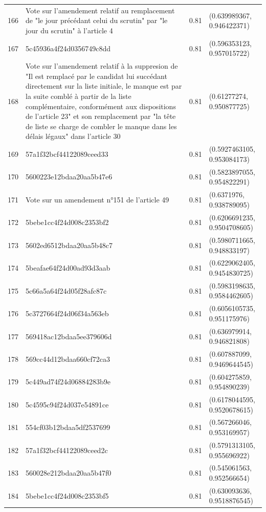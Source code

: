 \begin{table}[ht]
\begin{tabular}{rlrl}
  166 & Vote sur l'amendement relatif au remplacement de "le jour précédant celui du scrutin" par "le jour du scrutin" à l'article 4 & 0.81 & (0.639989367, 0.946422371) \\ 
  167 & 5c45936a4f24d0356749c8dd & 0.81 & (0.596353123, 0.957015722) \\ 
  168 & Vote sur l'amendement relatif à la suppresion de "Il est remplacé par le candidat lui succédant directement sur la liste initiale, le manque est par la suite comblé à partir de la liste complémentaire, conformément aux dispositions de l’article 23" et son remplacement par "la tête de liste se charge de combler le manque dans les délais légaux" dans l'article 30 & 0.81 & (0.61277274, 0.950877725) \\ 
  169 & 57a1f32bcf44122089ceed33 & 0.81 & (0.5927463105, 0.953084173) \\ 
  170 & 5600223e12bdaa20aa5b47e6 & 0.81 & (0.5823897055, 0.954822291) \\ 
  171 & Vote sur un amendement n°151 de l'article 49 & 0.81 & (0.6371976, 0.938789095) \\ 
  172 & 5bebe1cc4f24d008c2353bf2 & 0.81 & (0.6206691235, 0.9504708605) \\ 
  173 & 5602ed6512bdaa20aa5b48c7 & 0.81 & (0.5980711665, 0.948833197) \\ 
  174 & 5beafae64f24d00ad93d3aab & 0.81 & (0.6229062405, 0.9454830725) \\ 
  175 & 5c66a5a64f24d05f28afc87c & 0.81 & (0.5983198635, 0.9584462605) \\ 
  176 & 5c3727664f24d06f34a563eb & 0.81 & (0.6056105735, 0.951175976) \\ 
  177 & 569418ac12bdaa5ee379606d & 0.81 & (0.636979914, 0.946821808) \\ 
  178 & 569cc44d12bdaa660cf72ca3 & 0.81 & (0.607887099, 0.9469644545) \\ 
  179 & 5c449ad74f24d06884283b9e & 0.81 & (0.604275859, 0.954890239) \\ 
  180 & 5c4595c94f24d037e54891ce & 0.81 & (0.6178044595, 0.9520678615) \\ 
  181 & 554cf03b12bdaa5df2537699 & 0.81 & (0.567266046, 0.953169957) \\ 
  182 & 57a1f32bcf44122089ceed2c & 0.81 & (0.5791313105, 0.955696922) \\ 
  183 & 560028e212bdaa20aa5b47f0 & 0.81 & (0.545061563, 0.952566654) \\ 
  184 & 5bebe1cc4f24d008c2353bf5 & 0.81 & (0.630093636, 0.9518876545) \\ 

\end{tabular}
\end{table}
